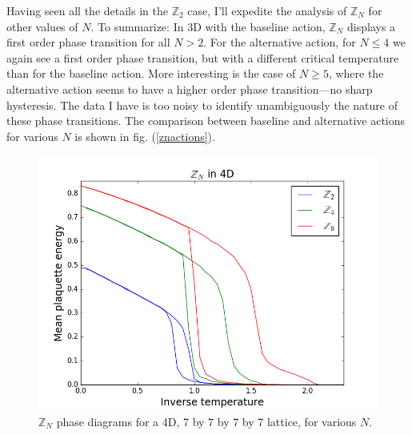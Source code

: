 \documentclass[9pt,twocolumn,twoside]{article}
\begin{document}
\newpage


Having seen all the details in the $\mathbb{Z}_2$ case, I'll expedite the analysis of $\mathbb{Z}_N$ for other values of $N$.  To summarize:  In 3D with the baseline action, $\mathbb{Z}_N$ displays a first order phase transition for all $N>2$.  For the alternative action, for $N\leq4$ we again see a first order phase transition, but with a different critical temperature than for the baseline action.  More interesting is the case of $N\geq 5$, where the alternative action seems to have a higher order phase transition---no sharp hysteresis.  The data I have is too noisy to identify unambiguously the nature of these phase transitions. The comparison between baseline and alternative actions for various $N$ is shown in fig. (\ref{znactions}).  

\begin{figure}[h!]
	\begin{centering}
	\includegraphics[width=\columnwidth]{zn,4d}
	\caption{$\mathbb{Z}_N$ phase diagrams for a 4D, 7 by 7 by 7 by 7 lattice, for various $N$.}
	\label{zn,4d}
	\end{centering}
\end{figure}
\end{document}
